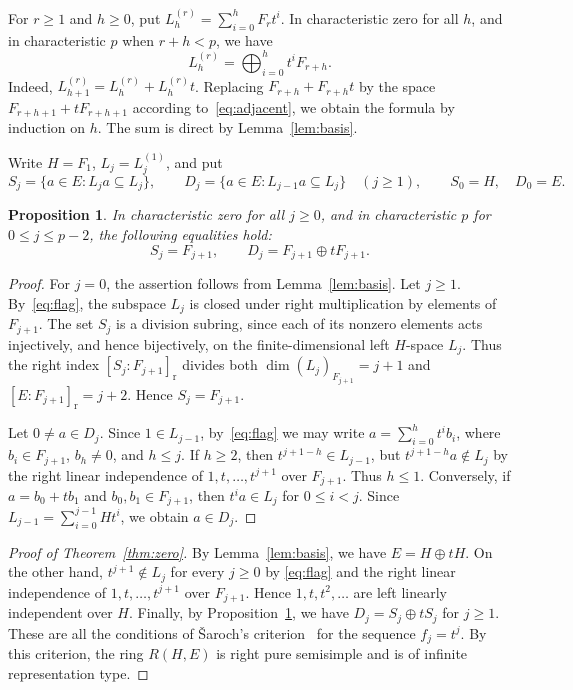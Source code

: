 \documentclass[11pt,a4paper,reqno]{amsart}
\numberwithin{equation}{section}
\newtheorem{proposition}[theorem]{Proposition}
\theoremstyle{remark}
\begin{document}
For $r\ge1$ and $h\ge0$, put
$L_h^{(r)}=\sum_{i=0}^h F_rt^i$.
In characteristic zero for all $h$, and in characteristic $p$ when $r+h<p$, we have
\begin{equation}\label{eq:flag}
 L_h^{(r)}=\bigoplus_{i=0}^h t^i F_{r+h}.
\end{equation}
Indeed, $L_{h+1}^{(r)}=L_h^{(r)}+L_h^{(r)}t$.
Replacing $F_{r+h}+F_{r+h}t$ by
the space $F_{r+h+1}+tF_{r+h+1}$ according to~\eqref{eq:adjacent}, we obtain the formula by induction
on $h$. The sum is direct by Lemma~\ref{lem:basis}.

Write $H=F_1$, $L_j=L_j^{(1)}$, and put
\[
 S_j=\{a\in E:L_j a\subseteq L_j\},\qquad
 D_j=\{a\in E:L_{j-1}a\subseteq L_j\}\quad(j\ge1),\qquad
 S_0=H,\quad D_0=E .
\]
\begin{proposition}\label{prop:flags}
In characteristic zero for all $j\ge0$, and in characteristic $p$
for $0\le j\le p-2$, the following equalities hold:
\[
 S_j=F_{j+1},\qquad D_j=F_{j+1}\oplus tF_{j+1}.
\]
\end{proposition}

\begin{proof}
For $j=0$, the assertion follows from Lemma~\ref{lem:basis}.
Let $j\ge1$. By~\eqref{eq:flag}, the subspace $L_j$ is closed under right multiplication by elements of $F_{j+1}$. The set $S_j$ is a division subring, since
each of its nonzero elements acts injectively, and hence bijectively, on the finite-dimensional left $H$-space
$L_j$. Thus the right index
$[S_j:F_{j+1}]_{\mathrm r}$ divides both $\dim (L_j)_{F_{j+1}}=j+1$
and $[E:F_{j+1}]_{\mathrm r}=j+2$. Hence $S_j=F_{j+1}$.

Let $0\ne a\in D_j$. Since $1\in L_{j-1}$, by~\eqref{eq:flag}
we may write $a=\sum_{i=0}^h t^i b_i$, where $b_i\in F_{j+1}$,
$b_h\ne0$, and $h\le j$. If $h\ge2$, then $t^{j+1-h}\in L_{j-1}$,
but $t^{j+1-h}a\notin L_j$ by the right linear independence of $1,t,\ldots,t^{j+1}$
over $F_{j+1}$. Thus $h\le1$. Conversely, if
$a=b_0+tb_1$ and $b_0,b_1\in F_{j+1}$, then $t^i a\in L_j$ for $0\le i<j$.
Since $L_{j-1}=\sum_{i=0}^{j-1}Ht^i$, we obtain $a\in D_j$.
\end{proof}

\begin{proof}[Proof of Theorem~\ref{thm:zero}]
By Lemma~\ref{lem:basis}, we have $E=H\oplus tH$.
On the other hand, $t^{j+1}\notin L_j$ for every $j\ge0$ by
\eqref{eq:flag} and the right linear independence of $1,t,\ldots,t^{j+1}$ over $F_{j+1}$.
Hence $1,t,t^2,\ldots$ are left linearly independent over $H$.
Finally, by Proposition~\ref{prop:flags}, we have $D_j=S_j\oplus tS_j$
for $j\ge1$. These are all the conditions of \v{S}aroch's criterion~\cite[Proposition~1.2]{Sar}
for the sequence $f_j=t^j$. By this criterion, the ring $R(H,E)$
is right pure semisimple and is of infinite representation type.
\end{proof}
\end{document}
